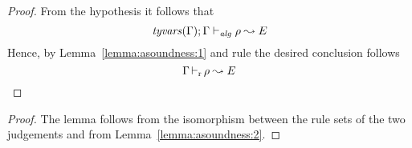 \begin{proof}
  From the hypothesis it follows that 
\begin{equation*}
  \mathit{tyvars}(\Gamma);\Gamma \vdash_{\mathit{alg}} \rho \leadsto E
\end{equation*}
  Hence, by Lemma~\ref{lemma:asoundness:1} and rule  the desired conclusion follows
\begin{equation*}
  \Gamma \mathop{\vdash_{\mathrm{r}}} \rho \leadsto E
\end{equation*}
\end{proof}



\begin{proof}
The lemma follows from the isomorphism between the 
rule sets of the two judgements and from Lemma~\ref{lemma:asoundness:2}.
\end{proof}

{\centering
{}}

